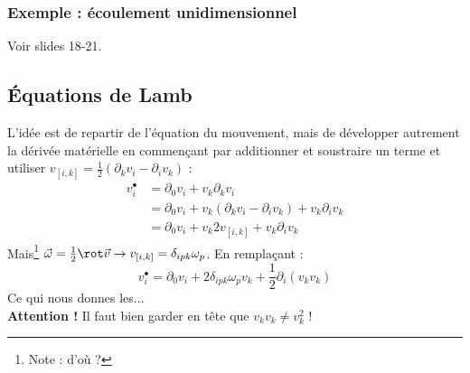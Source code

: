 		\subsubsection{Exemple : écoulement unidimensionnel}
		Voir slides 18-21.
	
	\subsection{Équations de Lamb}
	L'idée est de repartir de l'équation du mouvement, mais de développer autrement 
	la dérivée matérielle en commençant par additionner et soustraire un terme et utiliser
	$v_{[i,k]} = \frac{1}{2}(\partial_kv_i - \partial_iv_k)$ :
	\begin{equation}
	\begin{array}{ll}
	v_i^\bullet &= \partial_0v_i + v_k\partial_kv_i\\
	 &= \partial_0v_i + v_k(\partial_kv_i - \partial_iv_k)+v_k\partial_iv_k\\
	 &= \partial_0v_i + v_k 2 v_{[i,k]} + v_k\partial_iv_k
	\end{array}
	\end{equation}
	Mais\footnote{Note : d'où ?} $\vec{\omega} = \frac{1}{2}\rot \vec{v} \rightarrow 
	v_{[i,k]} = \delta_{ipk}\omega_p$. En remplaçant :
	\begin{equation}
	v_i^\bullet = \partial_0v_i + 2 \delta_{ipk} \omega_p v_k + \frac{1}{2}\partial_i
	(v_kv_k)
	\end{equation}
	Ce qui nous donnes les...\\
	
	\textbf{Attention !} Il faut bien garder en tête que $v_kv_k \neq v_k^2$ !
	
